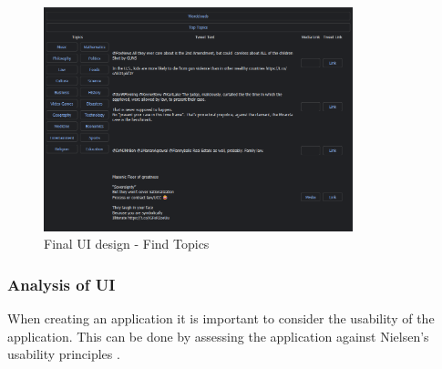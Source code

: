 \begin{figure}[hbtp]
    \centering
    \includegraphics[width=0.8\textwidth]{../images/UI-dark-1-ft.png}
    \caption{Final UI design - Find Topics}
    \label{fig:ui-findtopics}
\end{figure}

\subsubsection{Analysis of UI}
When creating an application it is important to consider the usability of the application. This can be done by assessing
the application against Nielsen's usability principles \cite{nielson}.


